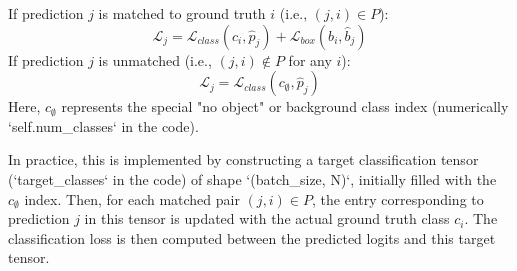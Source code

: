 If prediction $ j $ is matched to ground truth $ i $ (i.e., $ (j, i) \in P $):
\begin{equation}
    \mathcal{L}_j = \mathcal{L}_{class}(c_i, \hat{p}_j) + \mathcal{L}_{box}(b_i, \hat{b}_j)
\end{equation}
If prediction $ j $ is unmatched (i.e., $ (j, i) \notin P $ for any $ i $):
\begin{equation}
    \mathcal{L}_j = \mathcal{L}_{class}(c_{\emptyset}, \hat{p}_j)
\end{equation}
Here, $ c_{\emptyset} $ represents the special "no object" or background class index (numerically `self.num_classes` in the code).

In practice, this is implemented by constructing a target classification tensor (`target_classes` in the code) of shape `(batch_size, N)`, initially filled with the $ c_{\emptyset} $ index. Then, for each matched pair $ (j, i) \in P $, the entry corresponding to prediction $ j $ in this tensor is updated with the actual ground truth class $ c_i $. The classification loss is then computed between the predicted logits and this target tensor.

